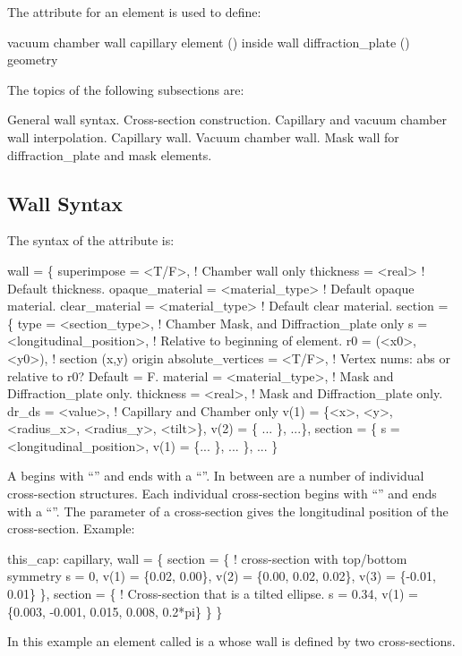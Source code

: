 The  attribute for an element is used to define:
\begin{example}
  vacuum chamber wall
  capillary element () inside wall
  diffraction_plate () geometry
\end{example}

The topics of the following subsections are:
\begin{example}
        General wall syntax.
        Cross-section construction. 
        Capillary and vacuum chamber wall interpolation.
        Capillary wall.
        Vacuum chamber wall.
        Mask wall for diffraction_plate and mask elements.
\end{example}

\subsection{Wall Syntax}
\label{s:wall.syntax}

The syntax of the  attribute is:
\begin{example}
  wall = \{
    superimpose = <T/F>,               ! Chamber wall only
    thickness = <real>                 ! Default thickness. 
    opaque_material = <material_type>  ! Default opaque material. 
    clear_material = <material_type>   ! Default clear material. 
    section = \{ 
      type = <section_type>,           ! Chamber Mask, and Diffraction_plate only
      s = <longitudinal_position>,     ! Relative to beginning of element.
      r0 = (<x0>, <y0>),               ! section (x,y) origin
      absolute_vertices = <T/F>,       ! Vertex nums: abs or relative to r0? Default = F.
      material = <material_type>,      ! Mask and Diffraction_plate only.
      thickness = <real>,              ! Mask and Diffraction_plate only.
      dr_ds = <value>,                 ! Capillary and Chamber only
      v(1) = \{<x>, <y>, <radius_x>, <radius_y>, <tilt>\}, 
      v(2) = \{ ... \},
      ...\},
    section = \{
      s = <longitudinal_position>, 
      v(1) = \{... \},
      ... \},
    ... \}
\end{example}
A  begins with ``'' and ends with a
``\vn{\}}''. In between are a number of individual cross-section
structures. Each individual cross-section begins with ``'' and ends with a ``\vn{\}}''. The  parameter of a
cross-section gives the longitudinal position of the cross-section.
Example:
\begin{example}
  this_cap: capillary, 
    wall = \{   
      section = \{ ! cross-section with top/bottom symmetry
        s = 0, v(1) =  \{0.02, 0.00\}, 
        v(2) = \{0.00, 0.02, 0.02\}, v(3) = \{-0.01, 0.01\} \}, 
      section = \{  ! Cross-section that is a tilted ellipse.
        s = 0.34, 
        v(1) = \{0.003, -0.001, 0.015, 0.008, 0.2*pi\} \} \}
\end{example}
In this example an element called  is a 
whose wall is defined by two cross-sections.

